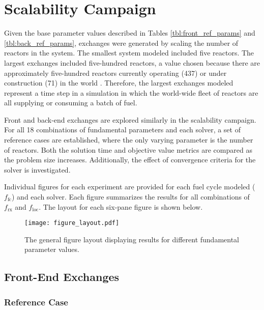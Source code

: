 
\section{Scalability Campaign}\label{results:scale}

Given the base parameter values described in Tables \ref{tbl:front_ref_params}
and \ref{tbl:back_ref_params}, exchanges were generated by scaling the number of
reactors in the system. The smallest system modeled included five reactors. The
largest exchanges included five-hundred reactors, a value chosen because there
are approximately five-hundred reactors currently operating (437) or under
construction (71) in the world \cite{nrxtrs}. Therefore, the largest exchanges
modeled represent a time step in a simulation in which the world-wide fleet of
reactors are all supplying or consuming a batch of fuel.

Front and back-end exchanges are explored similarly in the scalability
campaign. For all 18 combinations of fundamental parameters and each solver, a
set of reference cases are established, where the only varying parameter is the
number of reactors. Both the solution time and objective value metrics are
compared as the problem size increases. Additionally, the effect of convergence
criteria for the \cbc solver is investigated.

Individual figures for each experiment are provided for each fuel cycle modeled
($f_\text{fc}$) and each solver. Each figure summarizes the results for all
combinations of $f_\text{rx}$ and $f_\text{loc}$. The layout for each six-pane
figure is shown below.

\begin{figure}[h!]
  \begin{center}
    \texttt{[image: figure\_layout.pdf]}
    \caption{
      \label{fig:figure_layout}
      The general figure layout displaying results for different fundamental
      parameter values.}
  \end{center}
\end{figure}

\subsection{Front-End Exchanges}

\subsubsection{Reference Case}

